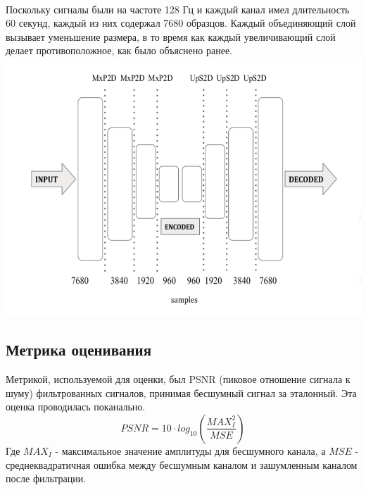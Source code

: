 \documentclass[12pt, a4paper, titlepage]{extreport}
\begin{document}
	\\
	Поскольку сигналы были на частоте 128 Гц и каждый канал имел длительность 60 секунд, каждый из них содержал 7680 образцов. Каждый объединяющий слой вызывает уменьшение размера, в то время как каждый увеличивающий слой делает противоположное, как было объяснено ранее.\\
	\includegraphics[scale=1]{dimensions.png}
	\\
	\subsection*{Метрика оценивания}
	Метрикой, используемой для оценки, был PSNR (пиковое отношение сигнала к шуму) фильтрованных сигналов, принимая бесшумный сигнал за эталонный. Эта оценка проводилась поканально.
	$$
	PSNR = 10\cdot log_{10} (\frac{MAX^2_I}{MSE})
	$$
	Где $MAX_I$ - максимальное значение амплитуды для бесшумного канала, а $MSE$ - среднеквадратичная ошибка между бесшумным каналом и зашумленным каналом после фильтрации.
\end{document}
